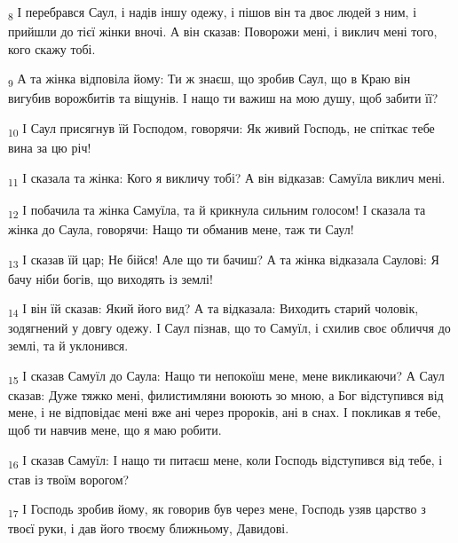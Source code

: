 \begin{tcolorbox}
\textsubscript{8} І перебрався Саул, і надів іншу одежу, і пішов він та двоє людей з ним, і прийшли до тієї жінки вночі. А він сказав: Поворожи мені, і виклич мені того, кого скажу тобі.
\end{tcolorbox}
\begin{tcolorbox}
\textsubscript{9} А та жінка відповіла йому: Ти ж знаєш, що зробив Саул, що в Краю він вигубив ворожбитів та віщунів. І нащо ти важиш на мою душу, щоб забити її?
\end{tcolorbox}
\begin{tcolorbox}
\textsubscript{10} І Саул присягнув їй Господом, говорячи: Як живий Господь, не спіткає тебе вина за цю річ!
\end{tcolorbox}
\begin{tcolorbox}
\textsubscript{11} І сказала та жінка: Кого я викличу тобі? А він відказав: Самуїла виклич мені.
\end{tcolorbox}
\begin{tcolorbox}
\textsubscript{12} І побачила та жінка Самуїла, та й крикнула сильним голосом! І сказала та жінка до Саула, говорячи: Нащо ти обманив мене, таж ти Саул!
\end{tcolorbox}
\begin{tcolorbox}
\textsubscript{13} І сказав їй цар; Не бійся! Але що ти бачиш? А та жінка відказала Саулові: Я бачу ніби богів, що виходять із землі!
\end{tcolorbox}
\begin{tcolorbox}
\textsubscript{14} І він їй сказав: Який його вид? А та відказала: Виходить старий чоловік, зодягнений у довгу одежу. І Саул пізнав, що то Самуїл, і схилив своє обличчя до землі, та й уклонився.
\end{tcolorbox}
\begin{tcolorbox}
\textsubscript{15} І сказав Самуїл до Саула: Нащо ти непокоїш мене, мене викликаючи? А Саул сказав: Дуже тяжко мені, филистимляни воюють зо мною, а Бог відступився від мене, і не відповідає мені вже ані через пророків, ані в снах. І покликав я тебе, щоб ти навчив мене, що я маю робити.
\end{tcolorbox}
\begin{tcolorbox}
\textsubscript{16} І сказав Самуїл: І нащо ти питаєш мене, коли Господь відступився від тебе, і став із твоїм ворогом?
\end{tcolorbox}
\begin{tcolorbox}
\textsubscript{17} І Господь зробив йому, як говорив був через мене, Господь узяв царство з твоєї руки, і дав його твоєму ближньому, Давидові.
\end{tcolorbox}
